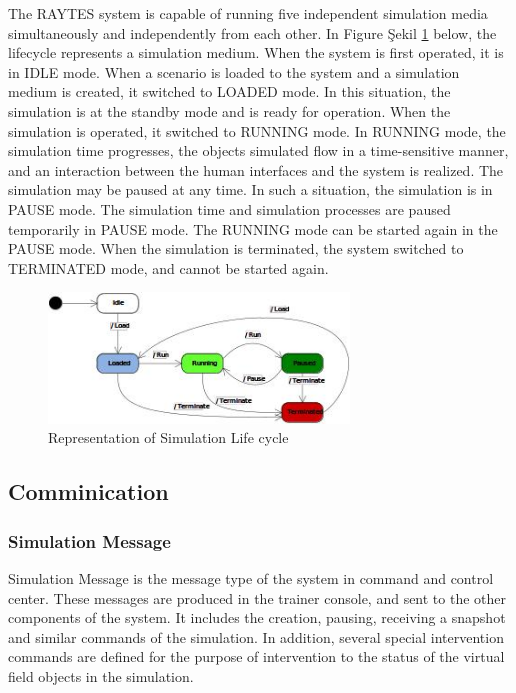 \documentclass[conference]{IEEEtran}
\begin{document}
The RAYTES system is capable of running five independent simulation media simultaneously and independently from each other. In Figure  Şekil \ref{fig:simyasamdongusu} below, the lifecycle represents a simulation medium. When the system is first operated,  
it is in IDLE mode. When a scenario is loaded to the system and a simulation medium is created, it switched to LOADED mode. In this situation, the simulation is at the standby mode and is ready for operation. When the simulation is operated, it switched to RUNNING mode. In RUNNING mode, the simulation time progresses, the objects simulated flow in a time-sensitive manner, and an interaction between the human interfaces and the system is realized. The simulation may be paused at any time. In such a situation, the simulation is in PAUSE mode. The simulation time and simulation processes are paused temporarily in PAUSE mode.  The RUNNING mode can be started again in the PAUSE mode. When the simulation is terminated, the system switched to TERMINATED mode, and cannot be started again. 




\begin{figure}[h!]
  \centering
  \includegraphics[width=8cm]{simyasamdongusu.jpg}
  \caption{Representation of Simulation Life cycle}\label{fig:simyasamdongusu}
\end{figure}

\subsection{Comminication}
\subsubsection{ Simulation Message}
Simulation Message is the message type of the system in command and control center. These messages are produced in the trainer console, and sent to the other components of the system. It includes the creation, pausing, receiving a snapshot and similar commands of the simulation. In addition, several special intervention commands are defined for the purpose of intervention to the status of the virtual field objects in the simulation.  
\end{document}
